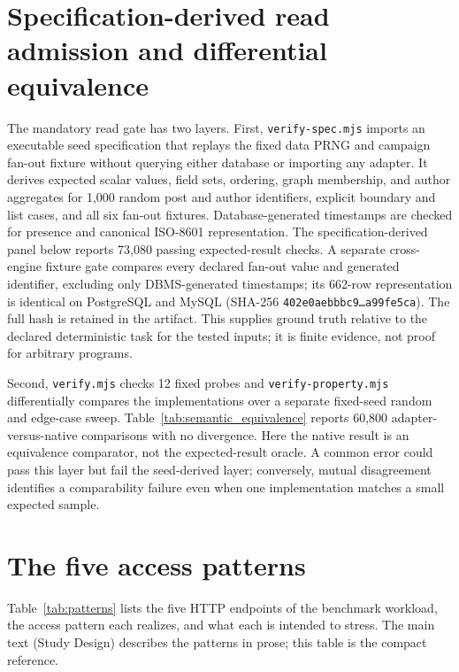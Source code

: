 \documentclass[11pt,a4paper]{article}
\newcommand{\tabledir}{tables/}
\begin{document}
\section{Specification-derived read admission and differential equivalence}
\label{sup:semantic-equivalence}
The mandatory read gate has two layers. First, \texttt{verify-spec.mjs} imports an executable seed specification that replays the fixed data PRNG and campaign fan-out fixture without querying either database or importing any adapter. It derives expected scalar values, field sets, ordering, graph membership, and author aggregates for 1,000 random post and author identifiers, explicit boundary and list cases, and all six fan-out fixtures. Database-generated timestamps are checked for presence and canonical ISO-8601 representation. The specification-derived panel below reports 73,080 passing expected-result checks. A separate cross-engine fixture gate compares every declared fan-out value and generated identifier, excluding only DBMS-generated timestamps; its 662-row representation is identical on PostgreSQL and MySQL (SHA-256 \texttt{402e0aebbbc9\ldots a99fe5ca}). The full hash is retained in the artifact. This supplies ground truth relative to the declared deterministic task for the tested inputs; it is finite evidence, not proof for arbitrary programs.



Second, \texttt{verify.mjs} checks 12 fixed probes and \texttt{verify-property.mjs} differentially compares the implementations over a separate fixed-seed random and edge-case sweep. Table~\ref{tab:semantic_equivalence} reports 60,800 adapter-versus-native comparisons with no divergence. Here the native result is an equivalence comparator, not the expected-result oracle. A common error could pass this layer but fail the seed-derived layer; conversely, mutual disagreement identifies a comparability failure even when one implementation matches a small expected sample.



\section{The five access patterns}
\label{sup:patterns}
Table~\ref{tab:patterns} lists the five HTTP endpoints of the benchmark workload, the access
pattern each realizes, and what each is intended to stress. The main text (Study Design) describes
the patterns in prose; this table is the compact reference.
\end{document}

